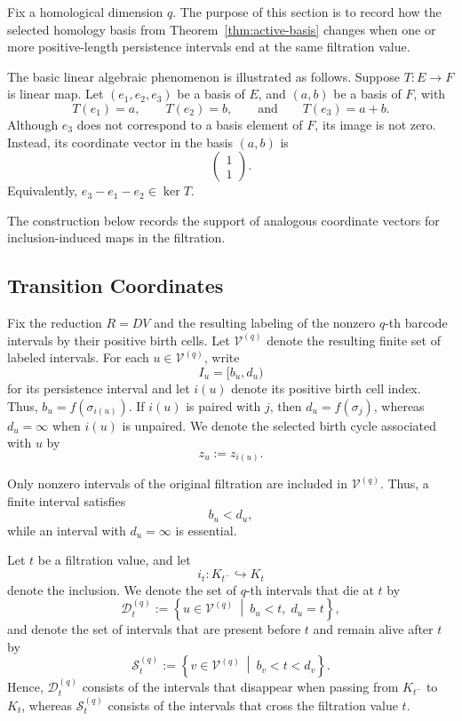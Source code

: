 \documentclass[11pt]{article}
\theoremstyle{paperdefinition}
\theoremstyle{paperplain}
\theoremstyle{paperremark}
\begin{document}
Fix a homological dimension $q$. The purpose of this section is to record how the selected homology basis from Theorem~\ref{thm:active-basis} changes when one or more positive-length persistence intervals end at the same filtration value.

The basic linear algebraic phenomenon is illustrated as follows. Suppose $T:E\longrightarrow F$ is linear map. Let $(e_1,e_2,e_3)$ be a basis of $E$, and $(a,b)$ be a basis of $F$, with
\[
T(e_1)=a,
\qquad
T(e_2)=b,
\qquad\text{and}\qquad
T(e_3)=a+b.
\]
Although $e_3$ does not correspond to a basis element of $F$, its image is not zero. Instead, its coordinate vector in the basis $(a,b)$ is
\[
\begin{pmatrix}
1\\
1
\end{pmatrix}.
\]
Equivalently, $e_3-e_1-e_2\in\ker T$. 

The construction below records the support of analogous coordinate vectors for inclusion-induced maps in the filtration.

\subsection{Transition Coordinates}
\label{subsec:transition-coordinates}

Fix the reduction $R=DV$ and the resulting labeling of the nonzero $q$-th barcode intervals by their positive birth cells. Let $\mathcal V^{(q)}$ denote the resulting finite set of labeled intervals. For each $u\in\mathcal V^{(q)}$, write
\[
I_u=[b_u,d_u)
\]
for its persistence interval and let $i(u)$ denote its positive birth cell index. Thus, $b_u=f(\sigma_{i(u)})$. If $i(u)$ is paired with $j$, then $d_u=f(\sigma_j)$, whereas $d_u=\infty$ when $i(u)$ is unpaired. We denote the selected birth cycle associated with $u$ by
\[
z_u := z_{i(u)}.
\]

Only nonzero intervals of the original filtration are included in $\mathcal V^{(q)}$. Thus, a finite interval satisfies
\[
b_u<d_u,
\]
while an interval with $d_u=\infty$ is essential.

Let $t$ be a filtration value, and let
\[
i_t:K_{t^-}\hookrightarrow K_t
\]
denote the inclusion. We denote the set of $q$-th intervals that die at $t$ by
\[
\mathcal D_t^{(q)} := \left\{u\in\mathcal V^{(q)} \ \middle|\ b_u<t,\; d_u=t\right\},
\]
and denote the set of intervals that are present before $t$ and remain alive after $t$ by
\[
\mathcal S_t^{(q)} := \left\{v\in\mathcal V^{(q)} \ \middle|\ b_v<t<d_v \right\}.
\]
Hence, $\mathcal D_t^{(q)}$ consists of the intervals that disappear when passing from $K_{t^-}$ to $K_t$, whereas $\mathcal S_t^{(q)}$ consists of the intervals that cross the filtration value $t$.
\end{document}
